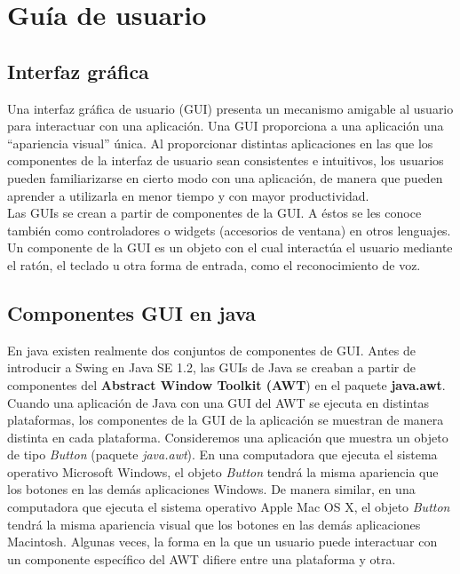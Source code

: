 \chapter{Guía de usuario}
\label{chap:guía de usuario}

\section{Interfaz gráfica}

Una interfaz gráfica de usuario (GUI) presenta un mecanismo amigable al usuario para interactuar con una aplicación. Una GUI proporciona a una aplicación una ``apariencia visual'' única. Al proporcionar distintas aplicaciones en las que los componentes de la interfaz de usuario sean consistentes e intuitivos, los usuarios pueden familiarizarse en cierto modo con una aplicación, de manera que pueden aprender a utilizarla en menor tiempo y con mayor productividad.\\

Las GUIs se crean a partir de componentes de la GUI. A éstos se les conoce también como controladores o widgets (accesorios de ventana) en otros lenguajes. Un componente de la GUI es un objeto con el cual interactúa el usuario mediante el ratón, el teclado u otra forma de entrada, como el reconocimiento de voz.\\

\section{Componentes GUI en java}

En java existen realmente dos conjuntos de componentes de GUI. Antes de introducir a Swing en Java SE 1.2, las GUIs de Java se creaban a partir de componentes del \textbf{Abstract Window Toolkit (AWT}) en el paquete \textbf{java.awt}. Cuando una aplicación de Java con una GUI del AWT se ejecuta en distintas plataformas, los componentes de la GUI de la aplicación se muestran de manera distinta en cada plataforma. Consideremos una aplicación que muestra un objeto de tipo \emph{Button} (paquete \emph{java.awt}). En una computadora que ejecuta el sistema operativo Microsoft Windows, el objeto \emph{Button} tendrá la misma apariencia que los botones en las demás aplicaciones Windows. De manera similar, en una computadora que ejecuta el sistema operativo Apple Mac OS X, el objeto \emph{Button} tendrá la misma apariencia visual que los botones en las demás aplicaciones Macintosh. Algunas veces, la forma en la que un usuario puede interactuar con un componente específico del AWT difiere entre una plataforma y otra.\\

